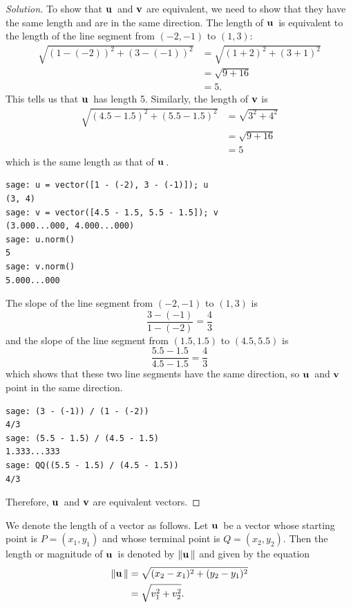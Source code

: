 \begin{proof}[Solution]
To show that $\operatorname*{\mathbf{u}}{}$ and $\operatorname*{\mathbf{v}}$ are equivalent, we need to show
that they have the same length and are in the same direction. The
length of $\operatorname*{\mathbf{u}}{}$ is equivalent to the length of the line segment
from $(-2,-1)$ to $(1,3)$:
%
\begin{align*}
\sqrt{(1 - (-2))^2 + (3 - (-1))^2}
&=
\sqrt{(1 + 2)^2 + (3 + 1)^2} \\
&=
\sqrt{9 + 16} \\
&=
5.
\end{align*}
%
This tells us that $\operatorname*{\mathbf{u}}{}$ has length 5. Similarly, the length of
$\operatorname*{\mathbf{v}}$ is
%
\begin{align*}
\sqrt{(4.5 - 1.5)^2 + (5.5 - 1.5)^2}
&=
\sqrt{3^2 + 4^2} \\
&=
\sqrt{9 + 16} \\
&=
5
\end{align*}
%
which is the same length as that of $\operatorname*{\mathbf{u}}{}$.

\begin{lstlisting}
sage: u = vector([1 - (-2), 3 - (-1)]); u
(3, 4)
sage: v = vector([4.5 - 1.5, 5.5 - 1.5]); v
(3.000...000, 4.000...000)
sage: u.norm()
5
sage: v.norm()
5.000...000
\end{lstlisting}

The slope of the line segment from $(-2,-1)$ to $(1,3)$ is
\[
\frac{3 - (-1)} {1 - (-2)}
=
\frac{4}{3}
\]
and the slope of the line segment from $(1.5,1.5)$ to $(4.5,5.5)$ is
\[
\frac{5.5 - 1.5}{4.5 - 1.5}
=
\frac{4}{3}
\]
which shows that these two line segments have the same direction, so
$\operatorname*{\mathbf{u}}{}$ and $\operatorname*{\mathbf{v}}$ point in the same direction.
%
\begin{lstlisting}
sage: (3 - (-1)) / (1 - (-2))
4/3
sage: (5.5 - 1.5) / (4.5 - 1.5)
1.333...333
sage: QQ((5.5 - 1.5) / (4.5 - 1.5))
4/3
\end{lstlisting}
%
Therefore, $\operatorname*{\mathbf{u}}{}$ and $\operatorname*{\mathbf{v}}$ are equivalent vectors.
\end{proof}

We denote the length of a vector as follows. Let $\operatorname*{\mathbf{u}}{}$ be a
vector whose starting point is $P = (x_1, y_1)$ and whose terminal
point is $Q = (x_2, y_2)$. Then the length or magnitude of $\operatorname*{\mathbf{u}}{}$
is denoted by $\left\Arrowvert \operatorname*{\mathbf{u}}{} \right\Arrowvert$ and given
by the equation
%
\begin{equation}
\label{eq:vectors_matrices:magnitude_two_dimensional_vector}
\begin{aligned}
\left\Arrowvert \operatorname*{\mathbf{u}}{} \right\Arrowvert
&=
\sqrt{(x_2 - x_1)^2 + (y_2 - y_1)^2} \\
&=
\sqrt{v_1^2 + v_2^2}.
\end{aligned}
\end{equation}



